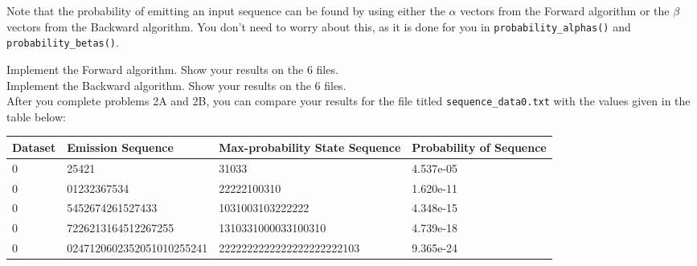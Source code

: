 \documentclass{article}
\begin{document}
Note that the probability of emitting an input sequence can be found by using either the $\alpha$ vectors from the Forward algorithm or the $\beta$ vectors from the Backward algorithm. You don't need to worry about this, as it is done for you in \texttt{probability\_alphas()} and \texttt{probability\_betas()}.

Implement the Forward algorithm. Show your results on the 6 files. \\
Implement the Backward algorithm. Show your results on the 6 files. \\

After you complete problems 2A and 2B, you can compare your results for the file titled \texttt{sequence_data0.txt} with the values given in the table below:
\begin{center}
  \begin{tabular}{ l | l |l | l }
Dataset & Emission Sequence & Max-probability State Sequence & Probability of Sequence  \\ \hline
0 & 25421                      &  31033           & 4.537e-05\\
0 & 01232367534                &  22222100310       & 1.620e-11\\
0 & 5452674261527433           &  1031003103222222      & 4.348e-15\\
0 & 7226213164512267255        &  1310331000033100310   & 4.739e-18\\
0 & 0247120602352051010255241  &  2222222222222222222222103 & 9.365e-24
 \\ \hline
 \end{tabular}
\end{center}
\end{document}
